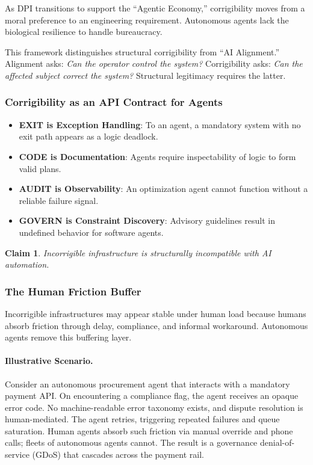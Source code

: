 \documentclass{article}
\newtheorem{claim}{Claim}
\begin{document}
As DPI transitions to support the ``Agentic Economy,'' corrigibility moves from a moral preference to an engineering requirement. Autonomous agents lack the biological resilience to handle bureaucracy.

This framework distinguishes structural corrigibility from ``AI Alignment.'' Alignment asks: \textit{Can the operator control the system?} Corrigibility asks: \textit{Can the affected subject correct the system?} Structural legitimacy requires the latter.

\subsubsection{Corrigibility as an API Contract for Agents}

\begin{itemize}[noitemsep]
    \item \textbf{EXIT is Exception Handling}: To an agent, a mandatory system with no exit path appears as a logic deadlock.
    \item \textbf{CODE is Documentation}: Agents require inspectability of logic to form valid plans.
    \item \textbf{AUDIT is Observability}: An optimization agent cannot function without a reliable failure signal.
    \item \textbf{GOVERN is Constraint Discovery}: Advisory guidelines result in undefined behavior for software agents.
\end{itemize}

\begin{claim}
Incorrigible infrastructure is structurally incompatible with AI automation.
\end{claim}

\subsubsection{The Human Friction Buffer}

Incorrigible infrastructures may appear stable under human load because humans absorb friction through delay, compliance, and informal workaround. Autonomous agents remove this buffering layer.

\paragraph{Illustrative Scenario.} Consider an autonomous procurement agent that interacts with a mandatory payment API. On encountering a compliance flag, the agent receives an opaque error code. No machine-readable error taxonomy exists, and dispute resolution is human-mediated. The agent retries, triggering repeated failures and queue saturation. Human agents absorb such friction via manual override and phone calls; fleets of autonomous agents cannot. The result is a governance denial-of-service (GDoS) that cascades across the payment rail.
\end{document}
